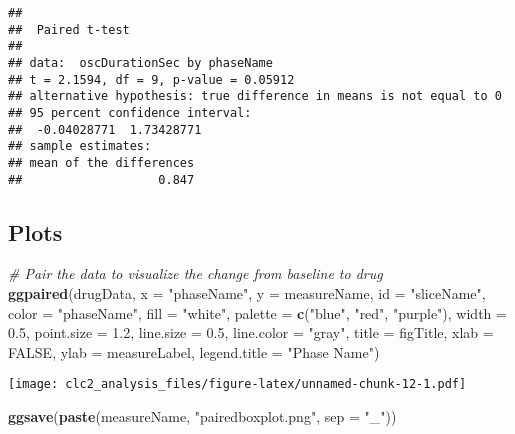 \documentclass[]{article}
\newenvironment{Shaded}{\begin{snugshade}}{\end{snugshade}}
\newcommand{\CommentTok}[1]{\textcolor[rgb]{0.56,0.35,0.01}{\textit{#1}}}
\newcommand{\DataTypeTok}[1]{\textcolor[rgb]{0.13,0.29,0.53}{#1}}
\newcommand{\FloatTok}[1]{\textcolor[rgb]{0.00,0.00,0.81}{#1}}
\newcommand{\KeywordTok}[1]{\textcolor[rgb]{0.13,0.29,0.53}{\textbf{#1}}}
\newcommand{\NormalTok}[1]{#1}
\newcommand{\OtherTok}[1]{\textcolor[rgb]{0.56,0.35,0.01}{#1}}
\newcommand{\StringTok}[1]{\textcolor[rgb]{0.31,0.60,0.02}{#1}}
\begin{document}
\begin{verbatim}
## 
##  Paired t-test
## 
## data:  oscDurationSec by phaseName
## t = 2.1594, df = 9, p-value = 0.05912
## alternative hypothesis: true difference in means is not equal to 0
## 95 percent confidence interval:
##  -0.04028771  1.73428771
## sample estimates:
## mean of the differences 
##                   0.847
\end{verbatim}

\hypertarget{plots}{%
\subsection{Plots}\label{plots}}

\begin{Shaded}
\begin{Highlighting}[]
\CommentTok{# Pair the data to visualize the change from baseline to drug}
\KeywordTok{ggpaired}\NormalTok{(drugData, }\DataTypeTok{x =} \StringTok{"phaseName"}\NormalTok{, }\DataTypeTok{y =}\NormalTok{ measureName, }\DataTypeTok{id =} \StringTok{"sliceName"}\NormalTok{,}
    \DataTypeTok{color =} \StringTok{"phaseName"}\NormalTok{, }\DataTypeTok{fill =} \StringTok{"white"}\NormalTok{, }\DataTypeTok{palette =} \KeywordTok{c}\NormalTok{(}\StringTok{"blue"}\NormalTok{, }\StringTok{"red"}\NormalTok{, }\StringTok{"purple"}\NormalTok{), }
    \DataTypeTok{width =} \FloatTok{0.5}\NormalTok{, }\DataTypeTok{point.size =} \FloatTok{1.2}\NormalTok{, }\DataTypeTok{line.size =} \FloatTok{0.5}\NormalTok{, }\DataTypeTok{line.color =} \StringTok{"gray"}\NormalTok{, }
    \DataTypeTok{title =}\NormalTok{ figTitle, }\DataTypeTok{xlab =} \OtherTok{FALSE}\NormalTok{, }\DataTypeTok{ylab =}\NormalTok{ measureLabel, }\DataTypeTok{legend.title =} \StringTok{"Phase Name"}\NormalTok{)}
\end{Highlighting}
\end{Shaded}

\texttt{[image: clc2\_analysis\_files/figure-latex/unnamed-chunk-12-1.pdf]}

\begin{Shaded}
\begin{Highlighting}[]
\KeywordTok{ggsave}\NormalTok{(}\KeywordTok{paste}\NormalTok{(measureName, }\StringTok{"pairedboxplot.png"}\NormalTok{, }\DataTypeTok{sep =} \StringTok{"_"}\NormalTok{))}
\end{Highlighting}
\end{Shaded}
\end{document}
